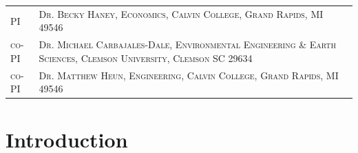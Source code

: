 \documentclass[11pt,a4paper]{article}
\begin{document}

\begin{table}
\begin{tabular}{lp{12cm}}
	\textsc{PI} & \textsc{Dr. Becky Haney, Economics, Calvin College, Grand Rapids, MI 49546}	\\
	\textsc{co-PI} & \textsc{Dr. Michael Carbajales-Dale, Environmental Engineering \& Earth Sciences, Clemson University, Clemson SC 29634} \\
	\textsc{co-PI} & \textsc{Dr. Matthew Heun, Engineering, Calvin College, Grand Rapids, MI 49546} \\
\end{tabular}
\end{table}
\section{Introduction}
\end{document}
